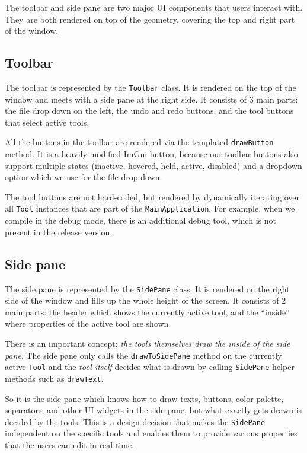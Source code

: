 The toolbar and side pane are two major UI components that users interact with.
They are both rendered on top of the geometry, covering the top and right part of the window.

\subsection{Toolbar}

The toolbar is represented by the \texttt{Toolbar} class.
It is rendered on the top of the window and meets with a side pane at the right side.
It consists of 3 main parts: the file drop down on the left, the undo and redo buttons, and the tool buttons that select active tools.

All the buttons in the toolbar are rendered via the templated \texttt{drawButton} method.
It is a heavily modified ImGui button, because our toolbar buttons also support multiple states (inactive, hovered, held, active, disabled) and a dropdown option which we use for the file drop down.

The tool buttons are not hard-coded, but rendered by dynamically iterating over all \texttt{Tool} instances that are part of the \texttt{MainApplication}.
For example, when we compile in the debug mode, there is an additional debug tool, which is not present in the release version.

\subsection{Side pane}

The side pane is represented by the \texttt{SidePane} class.
It is rendered on the right side of the window and fills up the whole height of the screen.
It consists of 2 main parts: the header which shows the currently active tool, and the ``inside'' where properties of the active tool are shown.

There is an important concept: \emph{the tools themselves draw the inside of the side pane}.
The side pane only calls the \texttt{drawToSidePane} method on the currently active \texttt{Tool} and the \emph{tool itself} decides what is drawn by calling \texttt{SidePane} helper methods such as \texttt{drawText}.

So it is the side pane which knows how to draw texts, buttons, color palette, separators, and other UI widgets in the side pane, but what exactly gets drawn is decided by the tools.
This is a design decision that makes the \texttt{SidePane} independent on the specific tools and enables them to provide various properties that the users can edit in real-time.

